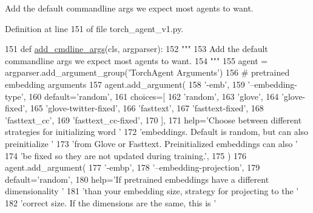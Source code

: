 \begin{DoxyVerb}Add the default commandline args we expect most agents to want.
\end{DoxyVerb}
 

Definition at line 151 of file torch\+\_\+agent\+\_\+v1.\+py.


\begin{DoxyCode}
151     \textcolor{keyword}{def }\hyperlink{namespaceparlai_1_1agents_1_1drqa_1_1config_a62fdd5554f1da6be0cba185271058320}{add\_cmdline\_args}(cls, argparser):
152         \textcolor{stringliteral}{"""}
153 \textcolor{stringliteral}{        Add the default commandline args we expect most agents to want.}
154 \textcolor{stringliteral}{        """}
155         agent = argparser.add\_argument\_group(\textcolor{stringliteral}{'TorchAgent Arguments'})
156         \textcolor{comment}{# pretrained embedding arguments}
157         agent.add\_argument(
158             \textcolor{stringliteral}{'-emb'},
159             \textcolor{stringliteral}{'--embedding-type'},
160             default=\textcolor{stringliteral}{'random'},
161             choices=[
162                 \textcolor{stringliteral}{'random'},
163                 \textcolor{stringliteral}{'glove'},
164                 \textcolor{stringliteral}{'glove-fixed'},
165                 \textcolor{stringliteral}{'glove-twitter-fixed'},
166                 \textcolor{stringliteral}{'fasttext'},
167                 \textcolor{stringliteral}{'fasttext-fixed'},
168                 \textcolor{stringliteral}{'fasttext\_cc'},
169                 \textcolor{stringliteral}{'fasttext\_cc-fixed'},
170             ],
171             help=\textcolor{stringliteral}{'Choose between different strategies for initializing word '}
172             \textcolor{stringliteral}{'embeddings. Default is random, but can also preinitialize '}
173             \textcolor{stringliteral}{'from Glove or Fasttext. Preinitialized embeddings can also '}
174             \textcolor{stringliteral}{'be fixed so they are not updated during training.'},
175         )
176         agent.add\_argument(
177             \textcolor{stringliteral}{'-embp'},
178             \textcolor{stringliteral}{'--embedding-projection'},
179             default=\textcolor{stringliteral}{'random'},
180             help=\textcolor{stringliteral}{'If pretrained embeddings have a different dimensionality '}
181             \textcolor{stringliteral}{'than your embedding size, strategy for projecting to the '}
182             \textcolor{stringliteral}{'correct size. If the dimensions are the same, this is '}

\end{DoxyCode}
